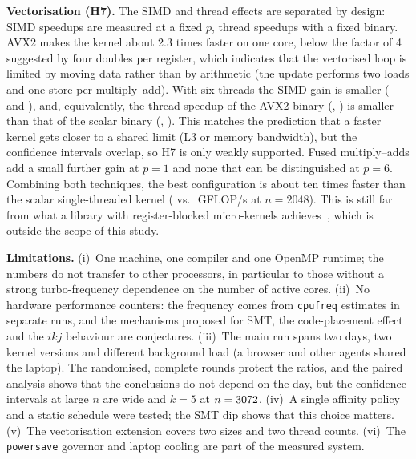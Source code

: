 \documentclass[conference,a4paper]{IEEEtran}
\begin{document}
\textbf{Vectorisation (H7).} The SIMD and thread effects are separated by design: SIMD speedups are measured at a fixed
$p$, thread speedups with a fixed binary. AVX2 makes the kernel about 2.3 times faster on one core, below the factor of 4
suggested by four doubles per register, which indicates that the vectorised loop is limited by moving data rather than by
arithmetic (the update performs two loads and one store per multiply--add). With six threads the SIMD gain is smaller
(\VecAvxPSixNTenTwentyFour{} and \VecAvxPSixNTwentyFortyEight), and, equivalently, the thread speedup of the AVX2 binary
(\VecThrAvxNTenTwentyFour, \VecThrAvxNTwentyFortyEight) is smaller than that of the scalar binary
(\VecThrScalarNTenTwentyFour, \VecThrScalarNTwentyFortyEight). This matches the prediction that a faster kernel gets closer
to a shared limit (L3 or memory bandwidth), but the confidence intervals overlap, so H7 is only weakly supported. Fused
multiply--adds add a small further gain at $p=1$ and none that can be distinguished at $p=6$. Combining both techniques,
the best configuration is about ten times faster than the scalar single-threaded kernel
(\VecGflopsFmaPSixNTwentyFortyEight{} vs.\ \VecGflopsScalarPOneNTwentyFortyEight\,GFLOP/s at $n=2048$). This is still far
from what a library with register-blocked micro-kernels achieves~\cite{goto2008}, which is outside the scope of this study.

\textbf{Limitations.} (i)~One machine, one compiler and one OpenMP runtime; the numbers do not transfer to other
processors, in particular to those without a strong turbo-frequency dependence on the number of active cores.
(ii)~No hardware performance counters: the frequency comes from \texttt{cpufreq} estimates in separate runs, and the
mechanisms proposed for SMT, the code-placement effect and the $ikj$ behaviour are conjectures. (iii)~The main run spans two
days, two kernel versions and different background load (a browser and other agents shared the laptop). The randomised,
complete rounds protect the ratios, and the paired analysis shows that the conclusions do not depend on the day, but the
confidence intervals at large $n$ are wide and $k=5$ at $n=3072$. (iv)~A single affinity policy and a static schedule
were tested; the SMT dip shows that this choice matters. (v)~The vectorisation extension covers two sizes and two thread
counts. (vi)~The \texttt{powersave} governor and laptop cooling are part of the measured system.

\end{document}

